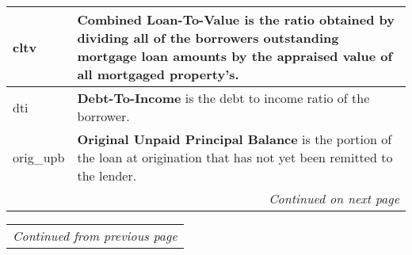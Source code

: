 \begin{appendices}
\begin{table}[h]
\begin{tabular}{|p{4cm}|p{10cm}|}
                cltv  & \textbf{Combined Loan-To-Value} is the ratio obtained by dividing all of the borrowers outstanding mortgage loan amounts by the appraised value of all mortgaged property’s. \\ \hline
                dti & \textbf{Debt-To-Income} is the debt to income ratio of the borrower. \\ \hline
                orig\_upb & \textbf{Original Unpaid Principal Balance} is the portion of the loan at origination that has not yet been remitted to the lender. \\ \hline
                \multicolumn{2}{r}{\textit{Continued on next page}} \\
            \end{tabular}
    \end{table}
    
    \clearpage
    
    \begin{center}
        \centering
            \begin{tabular}{|p{4cm}|p{10cm}|}
                \multicolumn{2}{r}{\textit{Continued from previous page}} \\
                

\end{tabular}
\end{center}
\end{appendices}
